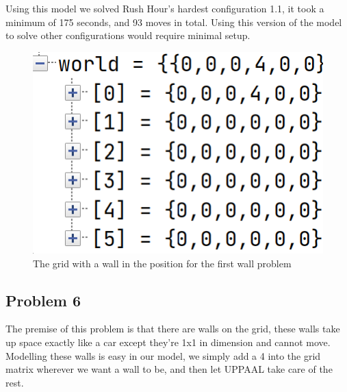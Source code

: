 \documentclass{article}
\begin{document}
Using this model we solved Rush Hour's hardest configuration 1.1, it took a minimum of 175 seconds, and 93 moves in total. Using this version of the model to solve other configurations would require minimal setup.

\begin{figure}[hbt!]
    \centering
    \includegraphics[width=0.5\linewidth]{images/walls.png}
    \caption{The grid with a wall in the position for the first wall problem}
\end{figure}

\subsection{Problem 6}
The premise of this problem is that there are walls on the grid, these walls take up space exactly like a car except they're 1x1 in dimension and cannot move.
Modelling these walls is easy in our model, we simply add a 4 into the grid matrix wherever we want a wall to be, and then let UPPAAL take care of the rest.


\newpage
\end{document}
